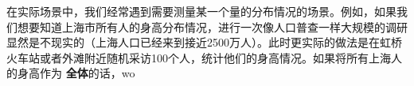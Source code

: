 
在实际场景中，我们经常遇到需要测量某一个量的分布情况的场景。例如，如果我们想要知道上海市所有人的身高分布情况，进行一次像人口普查一样大规模的调研显然是不现实的（上海人口已经来到接近2500万人）。此时更实际的做法是在虹桥火车站或者外滩附近随机采访100个人，统计他们的身高情况。如果将所有上海人的身高作为 \textbf{全体}的话，wo
